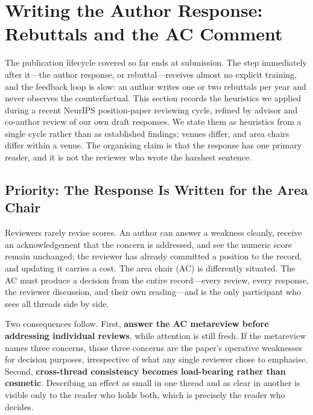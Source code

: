 
\section{Writing the Author Response: Rebuttals and the AC Comment}
\label{sec:rebuttals_and_ac_comments}

The publication lifecycle covered so far ends at submission.
The step immediately after it---the author response, or rebuttal---receives almost no explicit training, and the feedback loop is slow: an author writes one or two rebuttals per year and never observes the counterfactual.
This section records the heuristics we applied during a recent NeurIPS position-paper reviewing cycle, refined by advisor and co-author review of our own draft responses.
We state them as heuristics from a single cycle rather than as established findings; venues differ, and area chairs differ within a venue.
The organising claim is that the response has one primary reader, and it is not the reviewer who wrote the harshest sentence.

\subsection*{Priority: The Response Is Written for the Area Chair}

Reviewers rarely revise scores.
An author can answer a weakness cleanly, receive an acknowledgement that the concern is addressed, and see the numeric score remain unchanged; the reviewer has already committed a position to the record, and updating it carries a cost.
The area chair (AC) is differently situated.
The AC must produce a decision from the entire record---every review, every response, the reviewer discussion, and their own reading---and is the only participant who sees all threads side by side.

Two consequences follow.
First, \textbf{answer the AC metareview before addressing individual reviews}, while attention is still fresh.
If the metareview names three concerns, those three concerns are the paper's operative weaknesses for decision purposes, irrespective of what any single reviewer chose to emphasise.
Second, \textbf{cross-thread consistency becomes load-bearing rather than cosmetic}.
Describing an effect as small in one thread and as clear in another is visible only to the reader who holds both, which is precisely the reader who decides.

